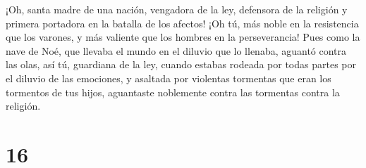  ¡Oh, santa madre de una nación, vengadora de la ley,
defensora de la religión y primera portadora en la batalla de los
afectos!  ¡Oh tú, más noble en la resistencia que los
varones, y más valiente que los hombres en la perseverancia!
 Pues como la nave de Noé, que llevaba el mundo en el
diluvio que lo llenaba, aguantó contra las olas,  así tú,
guardiana de la ley, cuando estabas rodeada por todas partes por el
diluvio de las emociones, y asaltada por violentas tormentas que eran
los tormentos de tus hijos, aguantaste noblemente contra las tormentas
contra la religión.

\hypertarget{section-15}{%
\section{16}\label{section-15}}

